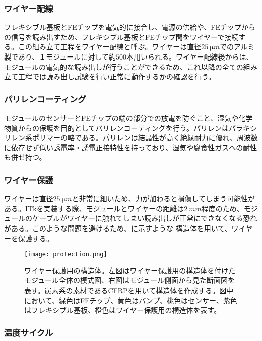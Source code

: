\subsubsection*{ワイヤー配線}

フレキシブル基板とFEチップを電気的に接合し、電源の供給や、FEチップからの信号を読み出すため、フレキシブル基板とFEチップ間をワイヤーで接続する。この組み立て工程をワイヤー配線と呼ぶ。ワイヤーは直径$25\ \si{\micro m}$でのアルミ製であり、１モジュールに対して約$500$本用いられる。ワイヤー配線後からは、モジュールの電気的な読み出しが行うことができるため、これ以降の全ての組み立て工程では読み出し試験を行い正常に動作するかの確認を行う。

\subsubsection*{パリレンコーティング}

モジュールのセンサーとFEチップの端の部分での放電を防ぐこと、湿気や化学物質からの保護を目的としてパリレンコーティングを行う。パリレンはパラキシリレン系ポリマーの略である。パリレンは結晶性が高く絶縁耐力に優れ、周波数に依存せず低い誘電率・誘電正接特性を持っており、湿気や腐食性ガスへの耐性も併せ持つ。


\subsubsection*{ワイヤー保護}

ワイヤーは直径$25\ \si{\micro m}$と非常に細いため、力が加わると損傷してしまう可能性がある。ITkを実装する際、モジュールとワイヤーの距離は$2\ \si{mm}$程度のため、モジュールのケーブルがワイヤーに触れてしまい読み出しが正常にできなくなる恐れがある。このような問題を避けるため、に示すような
構造体を用いて、ワイヤーを保護する。

\begin{figure}[tbp]
  \centering
  \texttt{[image: protection.png]}
  \caption[ワイヤー保護用の構造体]{ワイヤー保護用の構造体。左図はワイヤー保護用の構造体を付けたモジュール全体の模式図、右図はモジュール側面から見た断面図を表す。炭素系の素材であるCFRPを用いて構造体を作成する。図中において、緑色はFEチップ、黄色はバンプ、桃色はセンサー、紫色はフレキシブル基板、橙色はワイヤー保護用の構造体を表す。 }
  \label{fig:protection}
\end{figure}

\subsubsection*{温度サイクル}

